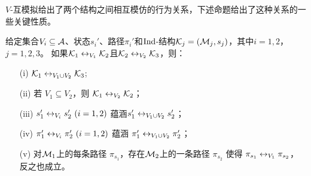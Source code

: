 $V$-互模拟给出了两个结构之间相互模仿的行为关系，下述命题给出了这种关系的一些关键性质。
\begin{proposition}\label{prop:bisimilar:V}
	给定集合$V_i\subseteq {\cal A}$、状态$s_i'$、路径$\pi_i'$和$\textrm{Ind}$-结构${\cal K}_j=({\cal M}_j,s_j)$，其中$i=1,2$，$j=1,2,3$。
	如果${\cal K}_1 \leftrightarrow_{V_1} {\cal K}_2$且${\cal K}_2 \leftrightarrow_{V_2} {\cal K}_3$，则：
	\begin{itemize}
		\item[(i)] ${\cal K}_1\leftrightarrow_{V_1\cup V_2}{\cal K}_3$;
		\item[(ii)] 若 $V_1 \subseteq V_2$，则 ${\cal K}_1 \leftrightarrow_{V_2} {\cal K}_2$；
		\item[(iii)] $s_1'\leftrightarrow_{V_i}s_2'~(i=1,2)$ 蕴涵$s_1'\leftrightarrow_{V_1\cup V_2}s_2'$；
		\item[(iv)] $\pi_1'\leftrightarrow_{V_i}\pi_2'~(i=1,2)$ 蕴涵 $\pi_1'\leftrightarrow_{V_1\cup V_2}\pi_2'$；
		\item[(v)] 对${\cal M}_1$上的每条路径 $\pi_{s_1}$，存在${\cal M}_2$上的一条路径 $\pi_{s_2}$ 使得 $\pi_{s_1} \leftrightarrow_{V_1} \pi_{s_2}$，反之也成立。
	\end{itemize}
\end{proposition}
